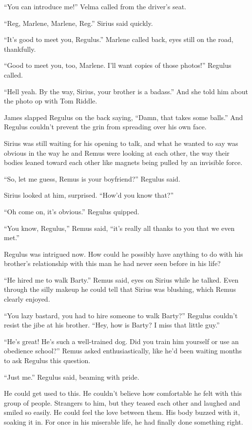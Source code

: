 \documentclass[12pt,twoside,openright]{memoir}
\begin{document}
``You can introduce me!'' Velma called from the driver's seat.

``Reg, Marlene, Marlene, Reg.'' Sirius said quickly. 

``It's good to meet you, Regulus.'' Marlene called back, eyes still on the road, thankfully. 

``Good to meet you, too, Marlene. I'll want copies of those photos!'' Regulus called. 

``Hell yeah. By the way, Sirius, your brother is a badass.'' And she told him about the photo op with Tom Riddle. 

James slapped Regulus on the back saying, ``Damn, that takes some balls.'' And Regulus couldn't prevent the grin from spreading over his own face. 

Sirius was still waiting for his opening to talk, and what he wanted to say was obvious in the way he and Remus were looking at each other, the way their bodies leaned toward each other like magnets being pulled by an invisible force. 

``So, let me guess, Remus is your boyfriend?'' Regulus said.

Sirius looked at him, surprised. ``How'd you know that?''

``Oh come on, it's obvious.'' Regulus quipped.

``You know, Regulus,'' Remus said, ``it's really all thanks to you that we even met.''

Regulus was intrigued now. How could he possibly have anything to do with his brother's relationship with this man he had never seen before in his life?

``He hired me to walk Barty.'' Remus said, eyes on Sirius while he talked. Even through the silly makeup he could tell that Sirius was blushing, which Remus clearly enjoyed. 

``You lazy bastard, you had to hire someone to walk Barty?'' Regulus couldn't resist the jibe at his brother. ``Hey, how is Barty? I miss that little guy.''

``He's great! He's such a well-trained dog. Did you train him yourself or use an obedience school?'' Remus asked enthusiastically, like he'd been waiting months to ask Regulus this question.

``Just me.'' Regulus said, beaming with pride. 

He could get used to this. He couldn't believe how comfortable he felt with this group of people. Strangers to him, but they teased each other and laughed and smiled so easily. He could feel the love between them. His body buzzed with it, soaking it in. For once in his miserable life, he had finally done something right.
\end{document}
